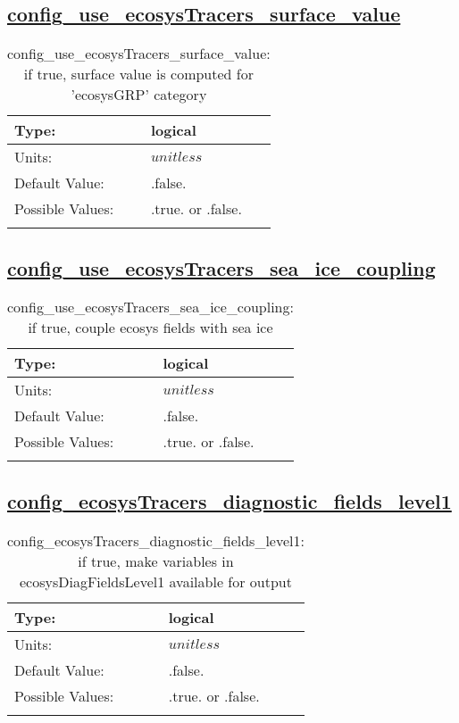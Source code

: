 \subsection[config\_use\_ecosysTracers\_surface\_value]{\hyperref[sec:nm_tab_tracer_forcing_ecosysTracers]{config\_use\_ecosysTracers\_surface\_value}}
\label{subsec:nm_sec_config_use_ecosysTracers_surface_value}
\begin{center}
\begin{longtable}{| p{2.0in} || p{4.0in} |}
    \hline
    Type: & logical \\
    \hline
    Units: & $unitless$ \\
    \hline
    Default Value: & .false. \\
    \hline
    Possible Values: & .true. or .false. \\
    \hline
    \caption{config\_use\_ecosysTracers\_surface\_value: if true, surface value is computed for 'ecosysGRP' category}
\end{longtable}
\end{center}
\subsection[config\_use\_ecosysTracers\_sea\_ice\_coupling]{\hyperref[sec:nm_tab_tracer_forcing_ecosysTracers]{config\_use\_ecosysTracers\_sea\_ice\_coupling}}
\label{subsec:nm_sec_config_use_ecosysTracers_sea_ice_coupling}
\begin{center}
\begin{longtable}{| p{2.0in} || p{4.0in} |}
    \hline
    Type: & logical \\
    \hline
    Units: & $unitless$ \\
    \hline
    Default Value: & .false. \\
    \hline
    Possible Values: & .true. or .false. \\
    \hline
    \caption{config\_use\_ecosysTracers\_sea\_ice\_coupling: if true, couple ecosys fields with sea ice}
\end{longtable}
\end{center}
\subsection[config\_ecosysTracers\_diagnostic\_fields\_level1]{\hyperref[sec:nm_tab_tracer_forcing_ecosysTracers]{config\_ecosysTracers\_diagnostic\_fields\_level1}}
\label{subsec:nm_sec_config_ecosysTracers_diagnostic_fields_level1}
\begin{center}
\begin{longtable}{| p{2.0in} || p{4.0in} |}
    \hline
    Type: & logical \\
    \hline
    Units: & $unitless$ \\
    \hline
    Default Value: & .false. \\
    \hline
    Possible Values: & .true. or .false. \\
    \hline
    \caption{config\_ecosysTracers\_diagnostic\_fields\_level1: if true, make variables in ecosysDiagFieldsLevel1 available for output}
\end{longtable}
\end{center}

